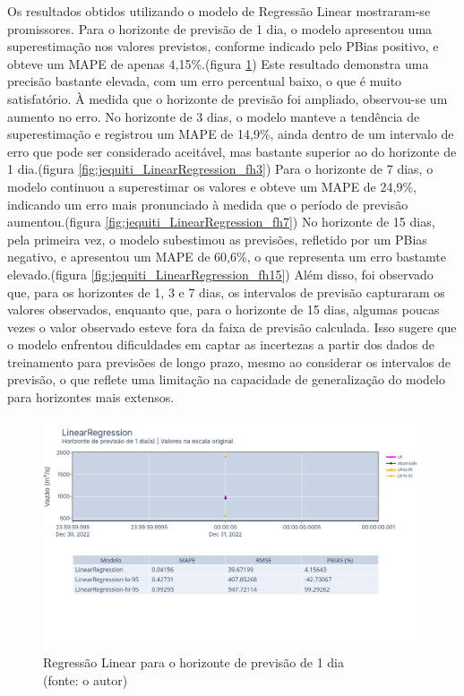 Os resultados obtidos utilizando o modelo de Regressão Linear mostraram-se promissores. Para o horizonte de previsão de 1 dia, o modelo apresentou uma superestimação nos valores previstos, conforme indicado pelo PBias positivo, e obteve um MAPE de apenas 4,15\%.(figura \ref{fig:jequiti_LinearRegression_fh1}) Este resultado demonstra uma precisão bastante elevada, com um erro percentual baixo, o que é muito satisfatório. À medida que o horizonte de previsão foi ampliado, observou-se um aumento no erro. No horizonte de 3 dias, o modelo manteve a tendência de superestimação e registrou um MAPE de 14,9\%, ainda dentro de um intervalo de erro que pode ser considerado aceitável, mas bastante superior ao do horizonte de 1 dia.(figura \ref{fig:jequiti_LinearRegression_fh3}) Para o horizonte de 7 dias, o modelo continuou a superestimar os valores e obteve um MAPE de 24,9\%, indicando um erro mais pronunciado à medida que o período de previsão aumentou.(figura \ref{fig:jequiti_LinearRegression_fh7}) No horizonte de 15 dias, pela primeira vez, o modelo subestimou as previsões, refletido por um PBias negativo, e apresentou um MAPE de 60,6\%, o que representa um erro bastamte elevado.(figura \ref{fig:jequiti_LinearRegression_fh15}) Além disso, foi observado que, para os horizontes de 1, 3 e 7 dias, os intervalos de previsão capturaram os valores observados, enquanto que, para o horizonte de 15 dias, algumas poucas vezes o valor observado esteve fora da faixa de previsão calculada. Isso sugere que o modelo enfrentou dificuldades em captar as incertezas a partir dos dados de treinamento para previsões de longo prazo, mesmo ao considerar os intervalos de previsão, o que reflete uma limitação na capacidade de generalização do modelo para horizontes mais extensos.

\begin{figure}[!h]
	\centering
	\includegraphics[scale=0.33]{Figuras/jequiti/resultados/LinearRegression_fh1.png}
	\caption{Regressão Linear para o horizonte de previsão de 1 dia\\(fonte: o autor)}
	\label{fig:jequiti_LinearRegression_fh1}
\end{figure}

